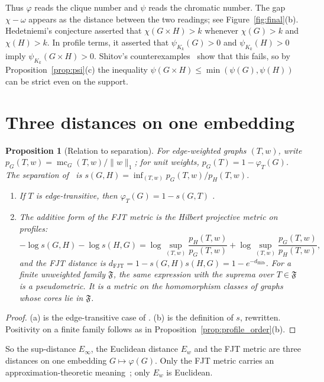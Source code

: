 \documentclass{article}
\newtheorem{proposition}[theorem]{Proposition}
\begin{document}
Thus $\varphi$ reads the clique number and $\psi$ reads the chromatic
number.  The gap $\chi-\omega$ appears as the distance between the two
readings; see Figure~\ref{fig:final}(b).  Hedetniemi's conjecture asserted
that $\chi(G\times H)>k$ whenever $\chi(G)>k$ and $\chi(H)>k$.  In profile
terms, it asserted that $\psi_{K_k}(G)>0$ and $\psi_{K_k}(H)>0$ imply
$\psi_{K_k}(G\times H)>0$.  Shitov's counterexamples~\cite{shitov2019}
show that this fails, so by Proposition~\ref{prop:psi}(c) the inequality
$\psi(G\times H)\le\min(\psi(G),\psi(H))$ can be strict even on the
support.

\section{Three distances on one embedding}

\begin{proposition}[Relation to separation]
\label{prop:profile_fjt}
For edge-weighted graphs $(T,w)$, write
$p_G(T,w)=\operatorname{mc}_G(T,w)/\|w\|_1$; for unit weights,
$p_G(T)=1-\varphi_T(G)$.  The separation of~\cite{fjt2009,efjt2015} is
$s(G,H)=\inf_{(T,w)}p_G(T,w)/p_H(T,w)$.
\begin{enumerate}
\item[(a)] If $T$ is edge-transitive, then $\varphi_T(G)=1-s(G,T)$
      \cite[Thm.~2.1]{efjt2015}.
\item[(b)] The additive form of the FJT metric is the Hilbert projective
      metric on profiles:
      \[
        -\log s(G,H)-\log s(H,G)
        =\log\sup_{(T,w)}\frac{p_H(T,w)}{p_G(T,w)}
        +\log\sup_{(T,w)}\frac{p_G(T,w)}{p_H(T,w)},
      \]
      and the FJT distance is $d_{\mathrm{FJT}}=1-s(G,H)s(H,G)=1-e^{-d_{\mathrm{Hilb}}}$.
      For a finite unweighted family $\mathfrak F$, the same expression with
      the suprema over $T\in\mathfrak F$ is a pseudometric.  It is a metric
      on the homomorphism classes of graphs whose cores lie in $\mathfrak F$.
\end{enumerate}
\end{proposition}

\begin{proof}
(a) is the edge-transitive case of \cite[Thm.~2.1]{efjt2015}.  (b) is the
definition of $s$, rewritten.  Positivity on a finite family follows as in
Proposition~\ref{prop:profile_order}(b).
\end{proof}

So the sup-distance $E_\infty$, the Euclidean distance $E_w$ and the FJT
metric are three distances on one embedding $G\mapsto\varphi(G)$.  Only the
FJT metric carries an approximation-theoretic meaning~\cite[Lemma~1.6]{efjt2015};
only $E_w$ is Euclidean.
\end{document}
